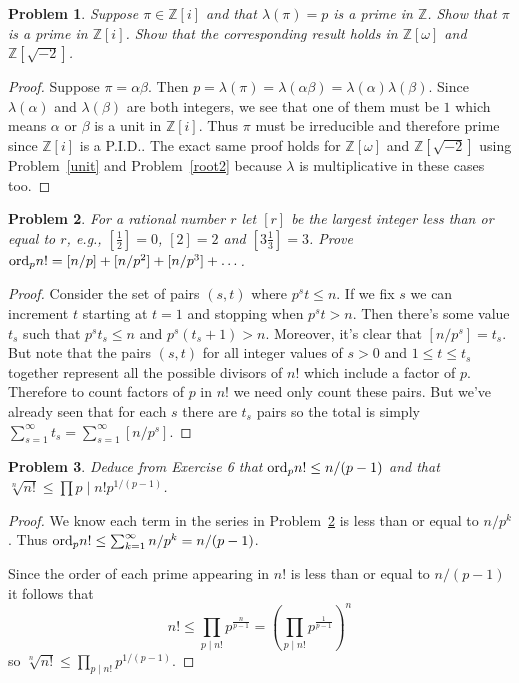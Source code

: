 \documentclass{article}
\newtheorem{problem}{Problem}
\newcommand{\ord}{\textup{ord}}
\begin{document}
\begin{problem}
Suppose $\pi \in \mathbb{Z}[i]$ and that $\lambda(\pi) = p$ is a prime in $\mathbb{Z}$. Show that $\pi$ is a prime in $\mathbb{Z}[i]$. Show that the corresponding result holds in $\mathbb{Z}[\omega]$ and $\mathbb{Z}[\sqrt{-2}]$.
\end{problem}
\begin{proof}
Suppose $\pi = \alpha \beta$. Then $p = \lambda (\pi) = \lambda (\alpha \beta) = \lambda (\alpha) \lambda (\beta)$. Since $\lambda (\alpha)$ and $\lambda(\beta)$ are both integers, we see that one of them must be $1$ which means $\alpha$ or $\beta$ is a unit in $\mathbb{Z}[i]$. Thus $\pi$ must be irreducible and therefore prime since $\mathbb{Z}[i]$ is a P.I.D.. The exact same proof holds for $\mathbb{Z}[\omega]$ and $\mathbb{Z}[\sqrt{-2}]$ using Problem~\ref{unit} and Problem~\ref{root2} because $\lambda$ is multiplicative in these cases too.
\end{proof}

\begin{problem}
\label{order}
For a rational number $r$ let $[r]$ be the largest integer less than or equal to $r$, e.g., $[\frac{1}{2}] = 0$, $[2] = 2$ and $[3\frac{1}{3}] = 3$. Prove $\ord_p n! = [n/p] + [n/p^2] + [n/p^3] + \dots$.
\end{problem}
\begin{proof}
Consider the set of pairs $(s,t)$ where $p^st \leq n$. If we fix $s$ we can increment $t$ starting at $t = 1$ and stopping when $p^st > n$. Then there's some value $t_s$ such that $p^st_s \leq n$ and $p^s(t_s+1) > n$. Moreover, it's clear that $[n/p^s] = t_s$. But note that the pairs $(s,t)$ for all integer values of $s > 0$ and $1 \leq t \leq t_s$ together represent all the possible divisors of $n!$ which include a factor of $p$. Therefore to count factors of $p$ in $n!$ we need only count these pairs. But we've already seen that for each $s$ there are $t_s$ pairs so the total is simply $\sum_{s=1}^{\infty} t_s = \sum_{s=1}^{\infty} [n/p^s]$.
\end{proof}

\begin{problem}
\label{product}
Deduce from Exercise 6 that $\ord_p n! \leq n/(p-1)$ and that $\sqrt[n]{n!} \leq \prod{p \mid n!} p^{1/(p-1)}$.
\end{problem}
\begin{proof}
We know each term in the series in Problem~\ref{order} is less than or equal to $n/p^k$. Thus $\ord_p n! \leq \sum_{k=1}^{\infty} n/p^k = n/(p-1)$.

Since the order of each prime appearing in $n!$ is less than or equal to $n/(p-1)$ it follows that
\[
n! \leq \prod_{p \mid n!} p^{\frac{n}{p-1}} = \left ( \prod_{p \mid n!} p^{\frac{1}{p-1}} \right )^n
\]
so $\sqrt[n]{n!} \leq \prod_{p \mid n!} p^{1/(p-1)}$.
\end{proof}
\end{document}
